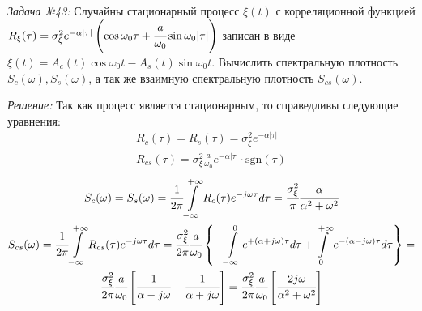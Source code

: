 \documentclass[14pt, final, titlepage, pscyr]{hedwork}
\begin{document}
\emph{Задача №43:} Случайны стационарный процесс \( \xi(t) \) с корреляционной 
функцией 
\( 
    R_\xi(\tau) = \sigma_\xi^2 e^{-\alpha|\tau|} \left( 
        \cos\omega_0\tau + \cfrac{a}{\omega_0}\sin\omega_0|\tau| 
    \right)
\) записан в виде \\ 
\( \xi(t) = A_c(t)\cos\omega_0 t - A_s(t)\sin\omega_0 t \). 
Вычислить спектральную плотность \( S_c(\omega), S_s(\omega) \), а так же 
взаимную спектральную плотность \( S_{cs}(\omega) \).

\emph{Решение:} Так как процесс является стационарным, то справедливы 
следующие уравнения:
\begin{gather}
    R_c(\tau) = R_s(\tau) = \sigma_\xi^2 e^{-\alpha|\tau|} \nonumber \\
    R_{cs}(\tau) = \sigma_\xi^2 \frac{a}{\omega_0} e^{-\alpha|\tau|} \cdot 
        \mathrm{sgn}(\tau) \nonumber
\end{gather}
\begin{gather}
    S_c(\omega) = S_s(\omega) = \cfrac{1}{2\pi} \int\limits_{-\infty}^{+\infty}
        R_c(\tau) e^{-j\omega\tau} d\tau = \cfrac{\sigma_\xi^2}{\pi}
        \cfrac{\alpha}{\alpha^2 + \omega^2} \nonumber \\
    S_{cs}(\omega) = \cfrac{1}{2\pi} \int\limits_{-\infty}^{+\infty}
        R_{cs}(\tau) e^{-j\omega\tau} d\tau = \cfrac{\sigma_\xi^2}{2\pi}
        \cfrac{a}{\omega_0} \left\{ 
            -\int\limits_{-\infty}^{0} e^{+(\alpha+j\omega)\tau} d\tau
            +\int\limits_{0}^{+\infty} e^{-(\alpha-j\omega)\tau} d\tau
        \right\} = \nonumber \\
        \cfrac{\sigma_\xi^2}{2\pi}\cfrac{a}{\omega_0} \left[ 
            \cfrac{1}{\alpha-j\omega} - \cfrac{1}{\alpha+j\omega}
        \right] = \cfrac{\sigma_\xi^2}{2\pi}\cfrac{a}{\omega_0} \left[ 
            \cfrac{2j\omega}{\alpha^2 + \omega^2}
        \right] \nonumber
\end{gather}
\end{document}
